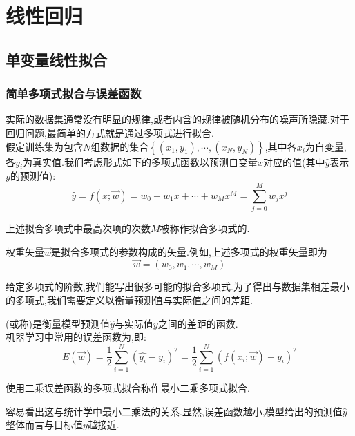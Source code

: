 \documentclass{ctexart}
\begin{document}
\setcounter{FormalCounter}{0}
\section{线性回归}
\subsection{单变量线性拟合}
\subsubsection{简单多项式拟合与误差函数}
实际的数据集通常没有明显的规律,或者内含的规律被随机分布的噪声所隐藏.对于回归问题,最简单的方式就是通过多项式进行拟合.\\
\indent 假定训练集为包含$N$组数据的集合$\left\{\left(x_1,y_1\right),\cdots,\left(x_N,y_N\right)\right\}$,其中各$x_i$为自变量,各$y_i$为真实值.我们考虑形式如下的多项式函数以预测自变量$x$对应的值(其中$\hat{y}$表示$y$的预测值):
\[\hat{y}=f(x;\vec{w})=w_0+w_1x+\cdots+w_Mx^M=\sum_{j=0}^{M}w_jx^j\]
\begin{definition}[拟合多项式的阶数]
    上述拟合多项式中最高次项的次数$M$被称作拟合多项式的.
\end{definition}
\begin{definition}[权重矢量]
    权重矢量$\vec{w}$是拟合多项式的参数构成的矢量.例如,上述多项式的权重矢量即为
    \[\vec{w}=\left(w_0,w_1,\cdots,w_M\right)\]
\end{definition}
给定多项式的阶数,我们能写出很多可能的拟合多项式.为了得出与数据集相差最小的多项式,我们需要定义以衡量预测值与实际值之间的差距.
\begin{definition}[误差函数]
    (或称)是衡量模型预测值$\hat{y}$与实际值$y$之间的差距的函数.\\
    机器学习中常用的误差函数为,即:
    \[E(\vec{w})=\dfrac12\sum_{i=1}^{N}\left(\hat{y_i}-y_i\right)^2=\dfrac12\sum_{i=1}^{N}\left(f(x_i;\vec{w})-y_i\right)^2\]
\end{definition}
\begin{definition}[最小二乘多项式拟合]
    使用二乘误差函数的多项式拟合称作最小二乘多项式拟合.
\end{definition}
容易看出这与统计学中最小二乘法的关系.显然,误差函数越小,模型给出的预测值$\hat{y}$整体而言与目标值$y$越接近.
\end{document}
